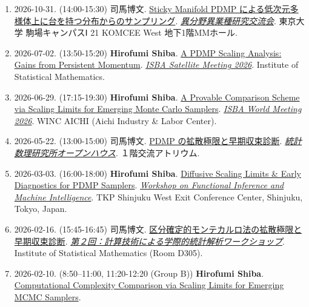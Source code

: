 \documentclass[
  11pt,
]{article}
\begin{document}
\begin{enumerate}
\def\labelenumi{\arabic{enumi}.}
\item
  2026-10-31. (14:00-15:30) 司馬博文.
  \href{https://162348.github.io/posts/2026/Posters/\%E7\%95\%B0\%E5\%88\%86\%E9\%87\%8E\%E7\%95\%B0\%E6\%A5\%AD\%E7\%A8\%AE\%E7\%A0\%94\%E7\%A9\%B6\%E4\%BA\%A4\%E6\%B5\%81\%E4\%BC\%9A.html}{Sticky
  Manifold PDMP による低次元多様体上に台を持つ分布からのサンプリング}.
  \emph{\href{https://jsiam.org/jsiam_archive/kr/career2026/}{異分野異業種研究交流会}}.
  東京大学 駒場キャンパスⅠ 21 KOMCEE West 地下1階MMホール.
\item
  2026-07-02. (13:50-15:20) \textbf{Hirofumi Shiba}.
  \href{https://162348.github.io/posts/2026/Posters/ISBA_Satellite.html}{A
  PDMP Scaling Analysis: Gains from Persistent Momentum}.
  \emph{\href{https://kkamatani.github.io/2026-isba-satellite/}{ISBA
  Satellite Meeting 2026}}. Institute of Statistical Mathematics.
\item
  2026-06-29. (17:15-19:30) \textbf{Hirofumi Shiba}.
  \href{https://162348.github.io/posts/2026/Posters/ISBA.html}{A
  Provable Comparison Scheme via Scaling Limits for Emerging Monte Carlo
  Samplers}. \emph{\href{https://isba2026.github.io/}{ISBA World Meeting
  2026}}. WINC AICHI (Aichi Industry \& Labor Center).
\item
  2026-05-22. (13:00-15:00) 司馬博文.
  \href{https://162348.github.io/posts/2026/Posters/OH.html}{PDMP
  の拡散極限と早期収束診断}.
  \emph{\href{https://www.ism.ac.jp/openhouse/2026/index.html}{統計数理研究所オープンハウス}}.
  １階交流アトリウム.
\item
  2026-03-03. (16:00-18:00) \textbf{Hirofumi Shiba}.
  \href{https://162348.github.io/posts/2026/Posters/FIMI.html}{Diffusive
  Scaling Limits \& Early Diagnostics for PDMP Samplers}.
  \emph{\href{https://fimiws.github.io/fimi2026/}{Workshop on Functional
  Inference and Machine Intelligence}}. TKP Shinjuku West Exit
  Conference Center, Shinjuku, Tokyo, Japan.
\item
  2026-02-16. (15:45-16:45) 司馬博文.
  \href{https://162348.github.io/posts/2026/Posters/ISACT.html}{区分確定的モンテカルロ法の拡散極限と早期収束診断}.
  \emph{\href{https://okuno.net/events/ISACT2026/}{第２回：計算技術による学際的統計解析ワークショップ}}.
  Institute of Statistical Mathematics (Room D305).
\item
  2026-02-10. (8:50--11:00, 11:20-12:20 (Group B)) \textbf{Hirofumi
  Shiba}.
  \href{https://162348.github.io/posts/2026/Posters/ISI-ISM-ISSAS.html}{Computational
  Complexity Comparison via Scaling Limits for Emerging MCMC Samplers}.

\end{enumerate}
\end{document}
